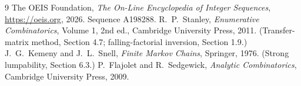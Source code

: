 \documentclass[11pt,a4paper]{article}
\theoremstyle{plain}
\theoremstyle{definition}
\begin{document}
\begin{thebibliography}{9}
 The OEIS Foundation, \emph{The On-Line Encyclopedia of Integer
Sequences}, \url{https://oeis.org}, 2026. Sequence A198288.
 R.~P.~Stanley, \emph{Enumerative Combinatorics}, Volume 1, 2nd ed.,
Cambridge University Press, 2011. (Transfer-matrix method, Section 4.7; falling-factorial
inversion, Section 1.9.)
 J.~G.~Kemeny and J.~L.~Snell, \emph{Finite Markov Chains}, Springer,
1976. (Strong lumpability, Section 6.3.)
 P.~Flajolet and R.~Sedgewick, \emph{Analytic Combinatorics}, Cambridge
University Press, 2009.
\end{thebibliography}
\end{document}
